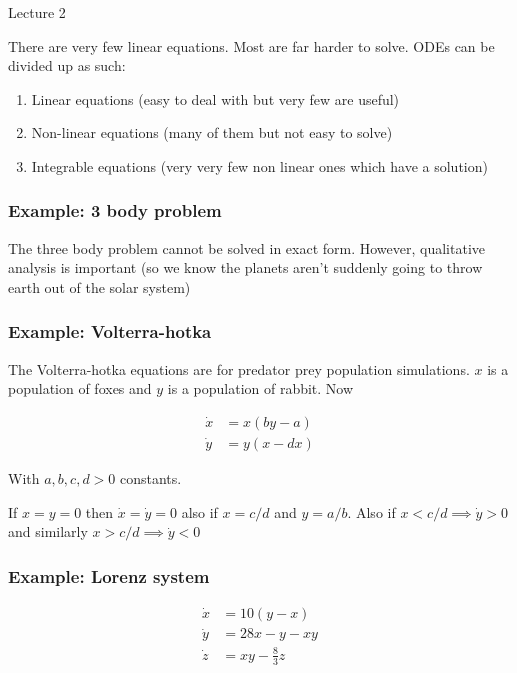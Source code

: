 \begin{center}

Lecture 2

\end{center}

There are very few linear equations. Most are far harder to solve. ODEs can be divided up as such:

\begin{enumerate}

\item Linear equations (easy to deal with but very few are useful)
\item Non-linear equations (many of them but not easy to solve)
\item Integrable equations (very very few non linear ones which have a solution)

\end{enumerate}

\subsubsection*{Example: 3 body problem}

The three body problem cannot be solved in exact form. However, qualitative analysis is important (so we know the planets aren't suddenly going to throw earth out of the solar system)

\subsubsection*{Example: Volterra-hotka}

The Volterra-hotka equations are for predator prey population simulations. $x$ is a population of foxes and $y$ is a population of rabbit. Now

\begin{align*}
\dot{x} &= x(by-a) \\
\dot{y} &= y(x-dx)
\end{align*}

With $a,b,c,d>0$ constants.

If $x=y=0$ then $\dot{x} = \dot{y} = 0$ also if $x = c/d$ and $y = a/b$. Also if $x < c/d \implies \dot{y} > 0$ and similarly $x > c/d \implies \dot{y} < 0$

\subsubsection*{Example: Lorenz system}

\begin{align*}
\dot{x} &= 10 (y-x) \\
\dot{y} &= 28x - y - xy \\
\dot{z} &= xy - \frac{8}{3} z
\end{align*}

